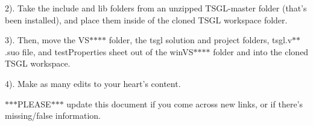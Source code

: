 2). Take the {\ttfamily include} and {\ttfamily lib} folders from an unzipped {\ttfamily T\-S\-G\-L-\/master} folder (that's been installed), and place them inside of the cloned T\-S\-G\-L workspace folder.

3). Then, move the {\ttfamily V\-S$\ast$$\ast$$\ast$$\ast$} folder, the {\ttfamily tsgl} solution and project folders, {\ttfamily tsgl.\-v$\ast$$\ast$.suo} file, and {\ttfamily test\-Properties} sheet out of the {\ttfamily win\-V\-S$\ast$$\ast$$\ast$$\ast$} folder and into the cloned T\-S\-G\-L workspace.

4). Make as many edits to your heart's content.

$\ast$$\ast$$\ast$\-P\-L\-E\-A\-S\-E$\ast$$\ast$$\ast$ update this document if you come across new links, or if there's missing/false information. 